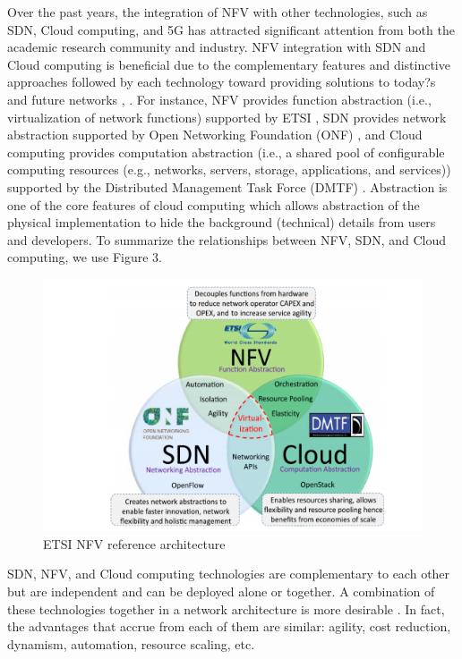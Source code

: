 Over the past years, the integration of NFV with other technologies, such as SDN, Cloud
computing, and 5G \cite{5} has attracted significant attention from both the academic research
community and industry.
NFV integration with SDN and Cloud computing is beneficial due to the complementary
features and distinctive approaches followed by each technology toward providing solutions
to today?s and future networks \cite{6}, \cite{7}. For instance, NFV provides function abstraction
(i.e., virtualization of network functions) supported by ETSI \cite{8}, SDN provides network
abstraction supported by Open Networking Foundation (ONF) \cite{9}, and Cloud computing
provides computation abstraction (i.e., a shared pool of configurable computing resources
(e.g., networks, servers, storage, applications, and services)) supported by the Distributed
Management Task Force (DMTF) \cite{10}. Abstraction is one of the core features of cloud
computing which allows abstraction of the physical implementation to hide the background
(technical) details from users and developers. To summarize the relationships between NFV,
SDN, and Cloud computing, we use Figure 3.
\begin{figure}[h]
    \centering
    \includegraphics[width=1\textwidth]{2_2_4_integration}
    \caption{ETSI NFV reference architecture}
    \label{fig:2_2_4_integration}
\end{figure}
SDN, NFV, and Cloud computing technologies are complementary to each other but are
independent and can be deployed alone or together. A combination of these technologies together in a network architecture is more desirable \cite{11}. In fact, the advantages that accrue
from each of them are similar: agility, cost reduction, dynamism, automation, resource
scaling, etc.